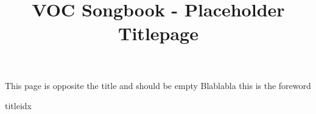 \documentclass{article}
\begin{document}
\title{VOC Songbook - Placeholder Titlepage}
\begin{titlepage}
\maketitle
\thispagestyle{empty}
\end{titlepage}
\newpage
This page is opposite the title and should be empty
\newpage
Blablabla this is the foreword
\newpage



\pagebreak
{}

\begin{songs}{titleidx}
































































\end{songs}
\end{document}

